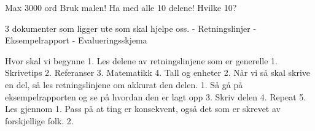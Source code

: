 Max 3000 ord
Bruk malen! 
Ha med alle 10 delene! 
    Hvilke 10? 


3 dokumenter som ligger ute som skal hjelpe oss. 
       - Retningslinjer    
       - Eksempelrapport
       - Evalueringsskjema

Hvor skal vi begynne 
1. Les delene av retningslinjene som er generelle
    1. Skrivetips 
    2. Referanser
    3. Matematikk
    4. Tall og enheter
2. Når vi så skal skrive en del, så les retningslinjene om akkurat den delen. 
    1. Så gå på eksempelrapporten og se på hvordan den er lagt opp
3. Skriv delen
4. Repeat
5. Les gjennom
    1. Pass på at ting er konsekvent, også det som er skrevet av forskjellige folk. 
    2. 
